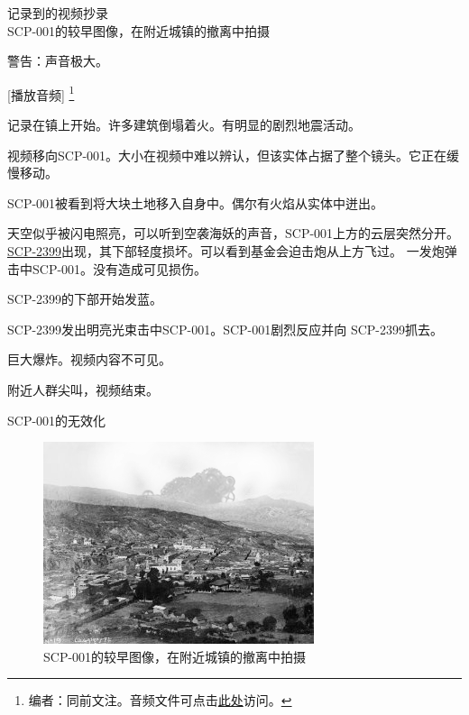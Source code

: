 记录到的视频抄录 \\
SCP-001的较早图像，在附近城镇的撤离中拍摄


警告：声音极大。

[播放音频]
\footnote{
编者\QIS：同前文注。音频文件可点击\href{http://scp-wiki.wdfiles.com/local--files/twistedgears-kaktus-proposal/Apotheosis.mp3}{此处}访问。}

\begin{scpbox}

记录在镇上开始。许多建筑倒塌着火。有明显的剧烈地震活动。

视频移向SCP-001。大小在视频中难以辨认，但该实体占据了整个镜头。它正在缓慢移动。

SCP-001被看到将大块土地移入自身中。偶尔有火焰从实体中迸出。

天空似乎被闪电照亮，可以听到空袭海妖的声音，SCP-001上方的云层突然分开。\hyperref[chap:SCP-2399]{SCP-2399}出现，其下部轻度损坏。可以看到基金会迫击炮从上方飞过。
一发炮弹击中SCP-001。没有造成可见损伤。

SCP-2399的下部开始发蓝。

SCP-2399发出明亮光束击中SCP-001。SCP-001剧烈反应并向 SCP-2399抓去。

巨大爆炸。视频内容不可见。

附近人群尖叫，视频结束。

\end{scpbox}

SCP-001的无效化

\begin{figure}[H]
	\centering
	\includegraphics[width=0.5\linewidth]{images/SCP.001.the.broken.god.7.png}
	\caption*{SCP-001的较早图像，在附近城镇的撤离中拍摄}
\end{figure}

